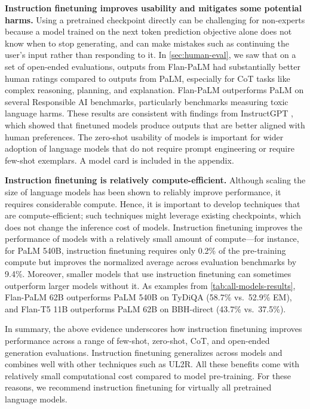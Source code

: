 \textbf{Instruction finetuning improves usability and mitigates some potential harms.} Using a pretrained checkpoint directly can be challenging for non-experts because a model trained on the next token prediction objective alone does not know when to stop generating, and can make mistakes such as continuing the user's input rather than responding to it. In \ref{sec:human-eval}, we saw that on a set of open-ended evaluations, outputs from Flan-PaLM had substantially better human ratings compared to outputs from PaLM, especially for CoT tasks like complex reasoning, planning, and explanation. Flan-PaLM outperforms PaLM on several Responsible AI benchmarks, particularly benchmarks measuring toxic language harms.  These results are consistent with findings from InstructGPT \citep{ouyang2022training}, which showed that finetuned models produce outputs that are better aligned with human preferences. The zero-shot usability of models is important for wider adoption of language models that do not require prompt engineering or require few-shot exemplars. A model card \citep{mitchell2019model} is included in the appendix.

\textbf{Instruction finetuning is relatively compute-efficient.} Although scaling the size of language models has been shown to reliably improve performance, it requires considerable compute. Hence, it is important to develop techniques that are compute-efficient; such techniques might leverage existing checkpoints, which does not change the inference cost of models. Instruction finetuning improves the performance of models with a relatively small amount of compute---for instance, for PaLM 540B, instruction finetuning requires only 0.2\% of the pre-training compute but improves the normalized average across evaluation benchmarks by 9.4\%. 
Moreover, smaller models that use instruction finetuning can sometimes outperform larger models without it. As examples from \ref{tab:all-models-results}, Flan-PaLM 62B outperforms PaLM 540B on TyDiQA (58.7\% vs.~52.9\% EM), and Flan-T5 11B outperforms PaLM 62B on BBH-direct (43.7\% vs.~37.5\%).

In summary, the above evidence underscores how instruction finetuning improves performance across a range of few-shot, zero-shot, CoT, and open-ended generation evaluations. Instruction finetuning generalizes across models and combines well with other techniques such as UL2R. All these benefits come with relatively small computational cost compared to model pre-training. For these reasons, we recommend instruction finetuning for virtually all pretrained language models.

